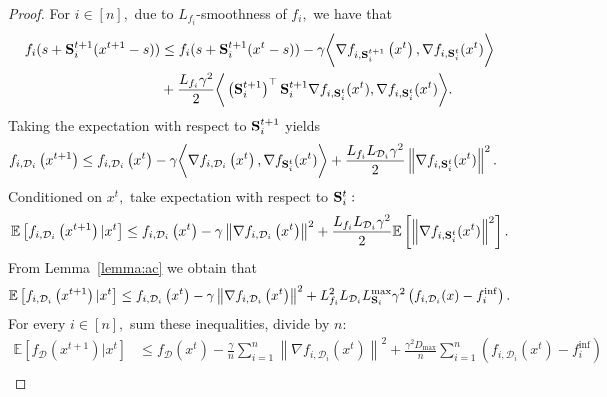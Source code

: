 \documentclass[10pt,a4paper]{amsart}
\newcommand{\Exp}[1]{{\bb E}\left[#1\right]}
\newcommand{\bb}{\mathbb}
\newcommand{\cD}{\mathcal{D}}
\newcommand{\mS}{{\bf S}}
\newcommand{\tf}{f_{\mathcal{D}}}
\begin{document}
\begin{proof}
	For $i\in[n],$ due to $L_{f_i}$-smoothness of $f_i,$ we have that
	\begin{equation*}
		\begin{split}
			f_i(s+\mS^{t+1}_i(x^{t+1} - s)) & \leq f_i(s+\mS^{t+1}_i(x^{t} - s))-\gamma \bigg{<} \nabla f_{i,\mS^{t+1}_i}\left(x^t\right), \nabla f_{i,\mS^{t}_i}(x^t) \bigg{>}\\
			& + \frac{L_{f_i}\gamma^2}{2}\bigg{<} \left(\mS^{t+1}_i\right)^{\top}\mS_i^{t+1}\nabla f_{i,\mS^{t}_i}(x^t), \nabla f_{i,\mS^{t}_i}(x^t) \bigg{>}.\\
		\end{split}
	\end{equation*}
	Taking the expectation with respect to $\mS_i^{t+1}$ yields
	\begin{equation*}
		\begin{split}
			f_{i, \cD_i}\left(x^{t+1}\right) &\leq f_{i, \cD_i}\left(x^{t}\right) - \gamma\bigg{<} \nabla f_{i, \cD_i}\left(x^t\right), \nabla f_{\mS_i^{t}}(x^t) \bigg{>} + \frac{L_{f_i}L_{\cD_i}\gamma^2}{2}\left\|\nabla f_{i,\mS_i^{t}}(x^t)\right\|^2.
		\end{split}
	\end{equation*}
	Conditioned on $x^t,$ take expectation with respect to $\mS^{t}_i:$
	\begin{equation*}
		\begin{split}
			\Exp{f_{i, \cD_i}\left(x^{t+1}\right)|x^t} \leq f_{i, \cD_i}\left(x^{t}\right) - \gamma \left\|\nabla f_{i, \cD_i}\left(x^t\right)\right\|^2 + \frac{L_{f_i}L_{\cD_i}\gamma^2}{2}\Exp{\left\|\nabla f_{i,\mS^{t}_i}(x^t) \right\|^2}.\\
		\end{split}
	\end{equation*}
	From Lemma~\ref{lemma:ac} we obtain that
	\begin{equation*}
		\begin{split}
			\Exp{f_{i, \cD_i}\left(x^{t+1}\right)|x^t} & \leq f_{i, \cD_i}\left(x^{t}\right) - \gamma \left\|\nabla f_{i, \cD_i}\left(x^t\right)\right\|^2 + L_{f_i}^2L_{\cD_i}L^{\max}_{\mS_i}\gamma^2 \left(f_{i, \cD_i}(x) - f_i^{\inf}\right).\\
		\end{split}
	\end{equation*}
	For every $i\in[n],$ sum these inequalities, divide by $n:$
	\begin{equation*}
		\begin{split}
			\Exp{\tf\left(x^{t+1}\right)|x^t} & \leq \tf\left(x^t\right) - \frac{\gamma}{n}\sum_{i=1}^{n}\left\|\nabla f_{i, \cD_i}\left(x^t\right)\right\|^2 + \frac{\gamma^2D_{\max}}{n}\sum_{i=1}^{n}\left(f_{i, \cD_i}(x^t) - f_i^{\inf}\right)\\

\end{split}
\end{equation*}
\end{proof}
\end{document}
